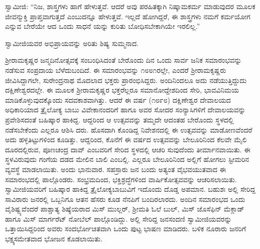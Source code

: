 ಸ್ವಾಮೀಜಿ: “ನಿಜ, ಶಾಸ್ತ್ರಗಳು ಹಾಗೆ ಹೇಳುತ್ತವೆ. ಆದರೆ ಅವು ಪರಹಿತಕ್ಕಾಗಿ ನಿಷ್ಕಾಮಕರ್ಮ ಮಾಡುವುದರ ಮೂಲಕ ಜೀವನ್ಮುಕ್ತಿ ಪ್ರಾಪ್ತವಾಗುತ್ತದೆ ಎಂಬುದನ್ನೂ ಹೇಳುತ್ತವೆ. ಇಲ್ಲದೆ ಹೋಗಿದ್ದರೆ, ಈ ಶಾಸ್ತ್ರಗಳು ನಮಗೆ ಕರ್ಮಯೋಗ ಎನ್ನುವ ಬೇರೆಯೇ ಆದ ಒಂದು ಸಾಧನೆ ಯನ್ನು ಕುರಿತು ಬೋಧಿಸಬೇಕಾಗಿಯೇ ಇರಲಿಲ್ಲ.”

ಸ್ವಾಮೀಜಿಯವರ ಅಭಿಪ್ರಾಯವನ್ನು ಅರಿತು ಶಿಷ್ಯ ಸುಮ್ಮನಾದ.

ಶ್ರೀರಾಮಕೃಷ್ಣರ ಜನ್ಮದಿನೋತ್ಸವಕ್ಕೆ ಸಂಬಂಧಿಸಿದಂತೆ ಬೇರೊಂದು ದಿನ ಒಂದು ಸಾರ್ವ ಜನಿಕ ಸಮಾರಂಭವನ್ನು ನಡೆಸುವ ಸಂಪ್ರದಾಯ ಬೆಳೆದುಬಂದಿದೆ. ಈ ಸಮಾರಂಭವನ್ನು ೧೮೮೧ರಲ್ಲೇ, ಎಂದರೆ ಶ್ರೀರಾಮಕೃಷ್ಣರು ಜೀವಿಸಿದ್ದಾಗಲೇ, ಸುರೇಂದ್ರನಾಥ ಮೊದಲಾದ ಭಕ್ತರು ಪ್ರಾರಂಭಿಸಿದ್ದರು. ಅಂದಿನಿಂದಲೂ ಅದು ನಡೆಯುತ್ತಿದ್ದುದು ದಕ್ಷಿಣೇಶ್ವರದಲ್ಲೇ. ಈ ಮೂಲಕ ಶ್ರೀರಾಮಕೃಷ್ಣರ ಭಕ್ತರೆಲ್ಲರೂ ಸಮಾನೋದ್ದೇಶದಿಂದ ಸೇರಿ, ಭಾವವಿನಿಮಯ ಮಾಡಿಕೊಳ್ಳುವುದಕ್ಕೊಂದು ಸದವಕಾಶವಾಗಿತ್ತು. ಆದರೆ ಈ ವರ್ಷ (೧೮೯೮) ದಕ್ಷಿಣೇಶ್ವರ ದೇವಾಲಯದ ಅಧಿಕಾರಿಯಾದ ತ್ರೈಲೋಕ್ಯ ಬಾಬು ವಿವೇಕಾನಂದರಿಗೆ ಹಾಗೂ ಅವರ ಸೋದರ ಸಂನ್ಯಾಸಿಗಳಿಗೆ ದೇವಾಲಯವನ್ನು ಪ್ರವೇಶಿಸದಂತೆ ಬಹಿಷ್ಕಾರ ಹಾಕಿದ್ದ. ಆದ್ದರಿಂದ ಆ ಉತ್ಸವವನ್ನು ತಮ್ಮದೇ ಆದಂತಹ ಬೇರೊಂದು ಸ್ಥಳದಲ್ಲಿ ನಡೆಸಬೇಕೆಂದು ಎಲ್ಲರೂ ಆಶಿಸಿ ದರು. ಹೊಸದಾಗಿ ಕೊಂಡಿದ್ದ ನಿವೇಶನದಲ್ಲಿ ಈ ಉತ್ಸವವನ್ನು ಮಾಡೋಣವೆಂದರೆ ಅದು ಹಳ್ಳತಿಟ್ಟುಗಳಿಂದ ಕೂಡಿತ್ತು. ಆದ್ದರಿಂದ, ಕೊನೆಗೆ ಈ ವರ್ಷದ ಉತ್ಸವವನ್ನು ಬೇಲೂರಿನಿಂದ ಕೆಲವೇ ಮೈಲಿ ದೂರದಲ್ಲಿರುವ, ಪೂಣಚಂದ್ರ ದಾವ್ ಎಂಬವರಿಗೆ ಸೇರಿದ ಸ್ಥಳದಲ್ಲಿ ಆಚರಿ ಸುವುದೆಂದು ತೀರ್ಮಾನವಾಯಿತು. ಈ ಸ್ಥಳವಿರುವುದು ಗಂಗೆಯ ದಡದ ಮೇಲಿನ ಬಾಲಿ ಎಂಬಲ್ಲಿ. ಎಲ್ಲರೂ ಬೇಲೂರಿನಿಂದ ಅಲ್ಲಿಗೆ ಹೋಗಲು ಸ್ಟೀಮರಿನ ವ್ಯವಸ್ಥೆ ಮಾಡಲಾಯಿತು. ಅಂದು ಭಾನುವಾರ. ಸಹಸ್ರಾರು ಜನ ಬಂದು ಅತ್ಯಂತ ವೈಭವಯುತವಾದ ಈ ಸಮಾರಂಭದಲ್ಲಿ ಪಾಲ್ಗೊಂಡರು. ಸಂಭ್ರಮದಿಂದ, ಭಕ್ತಿಶ್ರದ್ಧೆಗಳಿಂದ ವಾರ್ಷಿಕೋತ್ಸವವನ್ನು ಆಚರಿಸಲಾಯಿತು. ಸ್ವಾಮೀಜಿಯವರಿಗೆ ಬಹಿಷ್ಕಾರ ಹಾಕಿದ್ದ ತ್ರೈಲೋಕ್ಯಬಾಬುವಿಗೆ ಇದೊಂದು ದೊಡ್ಡ ಅಪಮಾನ. ಬಹುಶಃ ಅಲ್ಲಿ ಸೇರಿದ್ದ ಸಾವಿರಾರು ಜನರಲ್ಲಿ ಒಬ್ಬನಿಗೂ ಆತನ ಹೆಸರು ಕೂಡ ನೆನಪಿಗೆ ಬಂದಿರಲಾರದು. ಅಂದಿನ ಸಮಾರಂಭದ ಒಂದು ವೈಶಿಷ್ಟ್ಯವೆಂದರೆ ಪಾಶ್ಚಾತ್ಯ ಶಿಷ್ಯೆಯರಾದ ಮಿಸ್ ಮುಲ್ಲರ್, ಶ್ರೀಮತಿ ಓಲೆ ಬುಲ್, ಮಿಸ್ ಜೊಸೆಫಿನ್ ಮೆಕ್ಲಾಡ್ ಹಾಗೂ ಮಿಸ್ ಮಾರ್ಗರೆಟ್ ನೋಬೆಲ್ ಪಾಲ್ಗೊಂಡಿದ್ದು. ಅಲ್ಲಿ ಸೇರಿದ್ದ ಜನಸಂದಣಿ ಸ್ವಾಮೀಜಿಯವರನ್ನು ಒತ್ತಾಯಿಸಿದ್ದರಿಂದ ಅವರು ಸಂದರ್ಭೋಚಿತವಾಗಿ ಒಂದು ಪುಟ್ಟ ಭಾಷಣ ಮಾಡಿದರು. ಬಳಿಕ ನೂರಾರು ಜನರಿಗೆ ಭಕ್ಷ್ಯಸಮೇತವಾದ ಭೋಜನ ಕೊಡಲಾಯಿತು.

